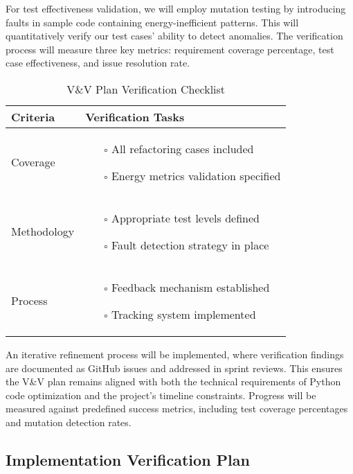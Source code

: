 \documentclass[12pt, titlepage]{article}
\begin{document}
\noindent For test effectiveness validation, we will employ mutation testing by introducing faults in sample code containing energy-inefficient patterns. This will quantitatively verify our test cases' ability to detect anomalies. The verification process will measure three key metrics: requirement coverage percentage, test case effectiveness, and issue resolution rate.

\begin{table}[H]
\centering
\caption{V\&V Plan Verification Checklist}
\begin{tabular}{|p{}|p{}|}
\hline
\textbf{Criteria} & \textbf{Verification Tasks} \\ \hline
Coverage & \begin{itemize}
\item[$\square$] All refactoring cases included
\item[$\square$] Energy metrics validation specified
\end{itemize} \\ \hline
Methodology & \begin{itemize}
\item[$\square$] Appropriate test levels defined
\item[$\square$] Fault detection strategy in place
\end{itemize} \\ \hline
Process & \begin{itemize}
\item[$\square$] Feedback mechanism established
\item[$\square$] Tracking system implemented
\end{itemize} \\ \hline
\end{tabular}
\end{table}

\noindent An iterative refinement process will be implemented, where verification findings are documented as GitHub issues and addressed in sprint reviews. This ensures the V\&V plan remains aligned with both the technical requirements of Python code optimization and the project's timeline constraints. Progress will be measured against predefined success metrics, including test coverage percentages and mutation detection rates.


\subsection{Implementation Verification Plan}
\end{document}
